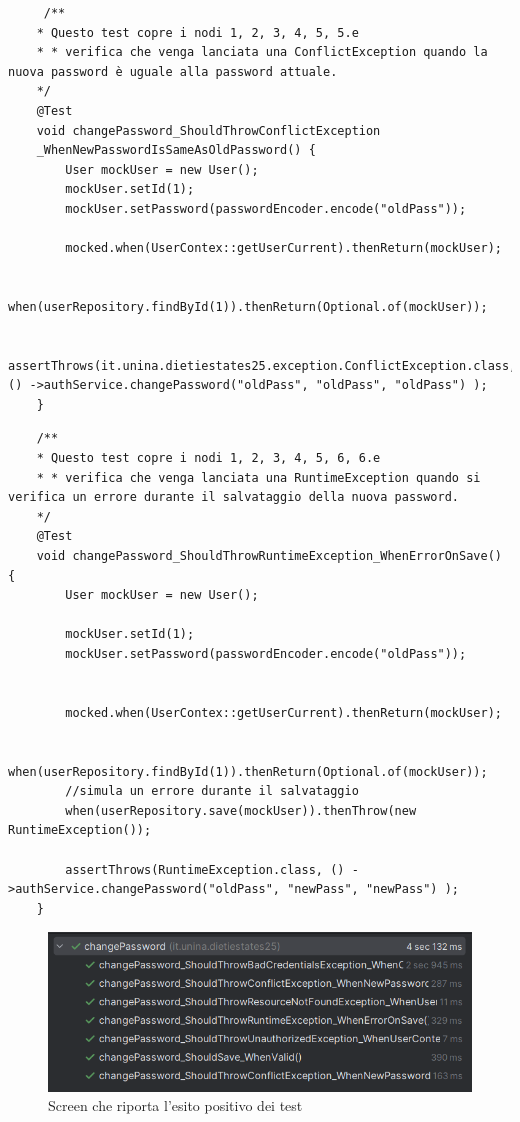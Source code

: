 \begin{lstlisting}
	 /**
	* Questo test copre i nodi 1, 2, 3, 4, 5, 5.e
	* * verifica che venga lanciata una ConflictException quando la nuova password è uguale alla password attuale.
	*/
	@Test
	void changePassword_ShouldThrowConflictException
	_WhenNewPasswordIsSameAsOldPassword() {
		User mockUser = new User();
		mockUser.setId(1);
		mockUser.setPassword(passwordEncoder.encode("oldPass"));
		
		mocked.when(UserContex::getUserCurrent).thenReturn(mockUser);
		
		when(userRepository.findById(1)).thenReturn(Optional.of(mockUser));
		
		assertThrows(it.unina.dietiestates25.exception.ConflictException.class, () ->authService.changePassword("oldPass", "oldPass", "oldPass") );
	}
\end{lstlisting}

\begin{lstlisting}
	/**
	* Questo test copre i nodi 1, 2, 3, 4, 5, 6, 6.e
	* * verifica che venga lanciata una RuntimeException quando si verifica un errore durante il salvataggio della nuova password.
	*/
	@Test
	void changePassword_ShouldThrowRuntimeException_WhenErrorOnSave() {
		User mockUser = new User();
		
		mockUser.setId(1);
		mockUser.setPassword(passwordEncoder.encode("oldPass"));
		
		
		mocked.when(UserContex::getUserCurrent).thenReturn(mockUser);
		
		when(userRepository.findById(1)).thenReturn(Optional.of(mockUser));
		//simula un errore durante il salvataggio
		when(userRepository.save(mockUser)).thenThrow(new RuntimeException());
		
		assertThrows(RuntimeException.class, () ->authService.changePassword("oldPass", "newPass", "newPass") );
	}
\end{lstlisting}

\begin{figure}[H]
	\centering
	\includegraphics[width=0.7\linewidth]{Immagini/unit test/esitiTestChangePassword.png}
	\caption[Esito test 4]{Screen che riporta l'esito positivo dei test}
\end{figure}
